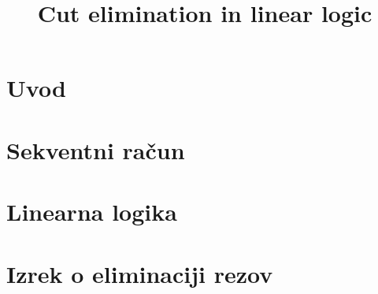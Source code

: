 \documentclass[mat1, tisk]{fmfdelo}
\title{Cut elimination in linear logic}
\theoremstyle{definition}
\begin{document}
\section{Uvod}


\section{Sekventni račun} \label{seq_calc}


\section{Linearna logika} \label{ll}


\section{Izrek o eliminaciji rezov} \label{ier}

\end{document}
